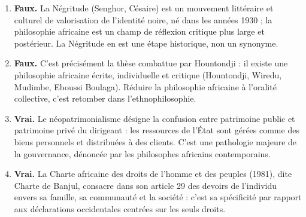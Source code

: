 \documentclass[11pt]{article}
\begin{document}
\begin{corrige}
\begin{enumerate}
\item \textbf{Faux.} La Négritude (Senghor, Césaire) est un mouvement littéraire et culturel de valorisation de l'identité noire, né dans les années 1930 ; la philosophie africaine est un champ de réflexion critique plus large et postérieur. La Négritude en est une étape historique, non un synonyme.
\item \textbf{Faux.} C'est précisément la thèse combattue par Hountondji : il existe une philosophie africaine écrite, individuelle et critique (Hountondji, Wiredu, Mudimbe, Eboussi Boulaga). Réduire la philosophie africaine à l'oralité collective, c'est retomber dans l'ethnophilosophie.
\item \textbf{Vrai.} Le néopatrimonialisme désigne la confusion entre patrimoine public et patrimoine privé du dirigeant : les ressources de l'État sont gérées comme des biens personnels et distribuées à des clients. C'est une pathologie majeure de la gouvernance, dénoncée par les philosophes africains contemporains.
\item \textbf{Vrai.} La Charte africaine des droits de l'homme et des peuples (1981), dite Charte de Banjul, consacre dans son article 29 des devoirs de l'individu envers sa famille, sa communauté et la société : c'est sa spécificité par rapport aux déclarations occidentales centrées sur les seuls droits.
\end{enumerate}
\end{corrige}
\end{document}
